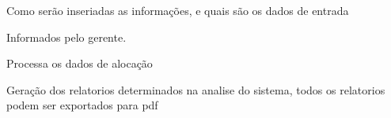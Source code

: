 
	Como serão inseriadas as informações, e quais são os dados de entrada

	Informados pelo gerente.


	Processa os dados de alocação


	Geração dos relatorios determinados na analise do sistema, todos os relatorios podem ser exportados para pdf
